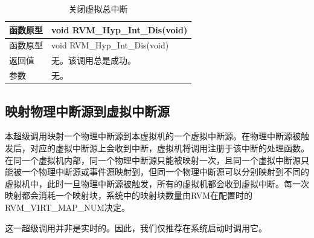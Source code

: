 \begin{xltabular}{\textwidth}{@{}>{\hsize\raggedright\arraybackslash}X>{\hsize\raggedright\arraybackslash}X@{}}
\caption{关闭虚拟总中断}\label{tab:4-8}\\
\toprule
函数原型 & void RVM\_\allowbreak{}Hyp\_\allowbreak{}Int\_\allowbreak{}Dis(void)\tabularnewline
\endfirsthead
\toprule
函数原型 & void RVM\_\allowbreak{}Hyp\_\allowbreak{}Int\_\allowbreak{}Dis(void)\tabularnewline
\midrule
\endhead
\bottomrule
\endlastfoot
返回值 & 无。该调用总是成功。\tabularnewline
参数 & 无。\tabularnewline
\end{xltabular}

\subsection{映射物理中断源到虚拟中断源}\label{subsec:4-4-5}

本超级调用映射一个物理中断源到本虚拟机的一个虚拟中断源。在物理中断源被触发后，对应的虚拟中断源上会收到中断，虚拟机将调用注册于该中断的处理函数。在同一个虚拟机内部，同一个物理中断源只能被映射一次，且同一个虚拟中断源只能被一个物理中断源或事件源映射到，但同一个物理中断源可以分别映射到不同的虚拟机中，此时一旦物理中断源被触发，所有的虚拟机都会收到虚拟中断。每一次映射都会消耗一个映射块，系统中的映射块数量由RVM在配置时的RVM\_VIRT\_MAP\_NUM决定。

这一超级调用并非是实时的。因此，我们仅推荐在系统启动时调用它。

